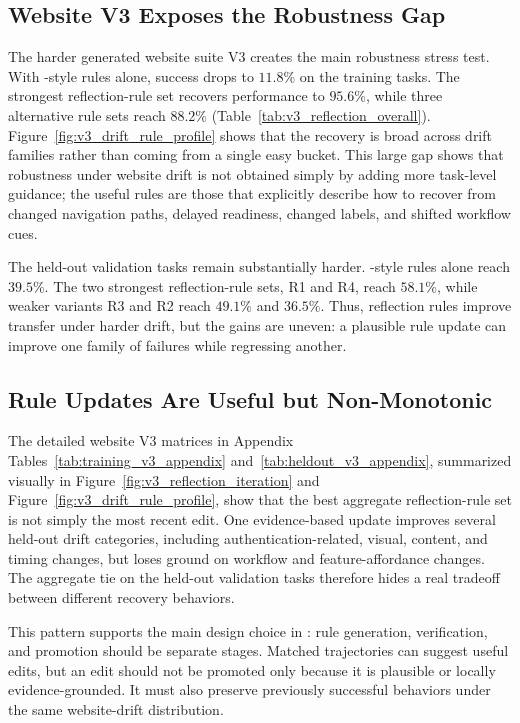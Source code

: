 \subsection{Website V3 Exposes the Robustness Gap}

The harder generated website suite V3 creates the main robustness stress test. With \expel{}-style rules alone, success drops to \(11.8\%\) on the training tasks. The strongest reflection-rule set recovers performance to \(95.6\%\), while three alternative rule sets reach \(88.2\%\) (Table~\ref{tab:v3_reflection_overall}). Figure~\ref{fig:v3_drift_rule_profile} shows that the recovery is broad across drift families rather than coming from a single easy bucket. This large gap shows that robustness under website drift is not obtained simply by adding more task-level guidance; the useful rules are those that explicitly describe how to recover from changed navigation paths, delayed readiness, changed labels, and shifted workflow cues.

The held-out validation tasks remain substantially harder. \expel{}-style rules alone reach \(39.5\%\). The two strongest reflection-rule sets, R1 and R4, reach \(58.1\%\), while weaker variants R3 and R2 reach \(49.1\%\) and \(36.5\%\). Thus, reflection rules improve transfer under harder drift, but the gains are uneven: a plausible rule update can improve one family of failures while regressing another.

\subsection{Rule Updates Are Useful but Non-Monotonic}

The detailed website V3 matrices in Appendix Tables~\ref{tab:training_v3_appendix} and~\ref{tab:heldout_v3_appendix}, summarized visually in Figure~\ref{fig:v3_reflection_iteration} and Figure~\ref{fig:v3_drift_rule_profile}, show that the best aggregate reflection-rule set is not simply the most recent edit. One evidence-based update improves several held-out drift categories, including authentication-related, visual, content, and timing changes, but loses ground on workflow and feature-affordance changes. The aggregate tie on the held-out validation tasks therefore hides a real tradeoff between different recovery behaviors.

This pattern supports the main design choice in \webcoevo{}: rule generation, verification, and promotion should be separate stages. Matched trajectories can suggest useful edits, but an edit should not be promoted only because it is plausible or locally evidence-grounded. It must also preserve previously successful behaviors under the same website-drift distribution.


